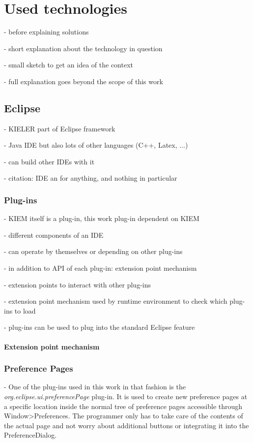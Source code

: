 \chapter{Used technologies}
\label{chapter:ConfTechnology}
- before explaining solutions

- short explanation about the technology in question

- small sketch to get an idea of the context

- full explanation goes beyond the scope of this work

\section{Eclipse}
- KIELER part of Eclipse framework

- Java IDE but also lots of other languages (C++, Latex, ...)

- can build other IDEs with it

- citation: IDE an for anything, and nothing in particular \cite{eclipseOverview}

\subsection{Plug-ins}
- \ac{KIEM} itself is a plug-in, this work plug-in dependent on \ac{KIEM}

- different components of an \ac{IDE} 

- can operate by themselves or depending on other plug-ins

- in addition to \ac{API} of each plug-in: extension point mechanism

- extension points to interact with other plug-ins

- extension point mechanism used by runtime environment to check which plug-ins to load

- plug-ins can be used to plug into the standard Eclipse feature
\subsubsection{Extension point mechanism}
\label{section:ConfTechnologyExtension}


\subsection{Preference Pages}
- One of the plug-ins used in this work in that fashion is the \emph{org.eclipse.ui.preferencePage}
plug-in. It is used to create new preference pages at a specific location inside the
normal tree of preference pages accessible through Window>Preferences.
The programmer only has to take care of the contents of the actual page and not worry
about additional buttons or integrating it into the PreferenceDialog.

